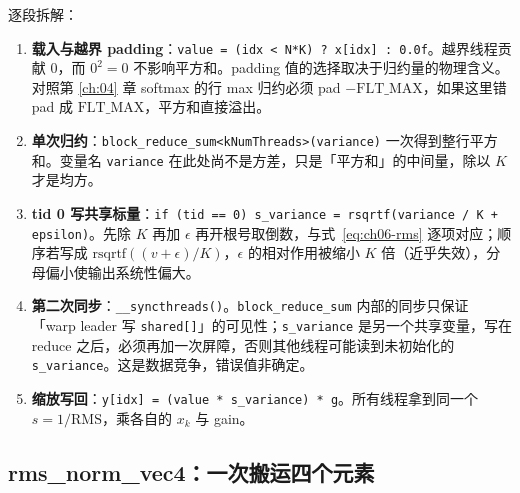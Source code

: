 逐段拆解：
\begin{enumerate}
  \item \textbf{载入与越界 padding}：\texttt{value = (idx < N*K) ? x[idx] : 0.0f}。越界线程贡献 $0$，而 $0^2 = 0$ 不影响平方和。padding 值的选择取决于归约量的物理含义。对照第 \ref{ch:04} 章 softmax 的行 max 归约必须 pad $-\mathrm{FLT\_MAX}$，如果这里错 pad 成 $\mathrm{FLT\_MAX}$，平方和直接溢出。
  \item \textbf{单次归约}：\texttt{block\_\allowbreak{}reduce\_\allowbreak{}sum\allowbreak{}<k\allowbreak{}Num\allowbreak{}Threads>\allowbreak{}(variance)} 一次得到整行平方和。变量名 \texttt{variance} 在此处尚不是方差，只是「平方和」的中间量，除以 $K$ 才是均方。
  \item \textbf{tid 0 写共享标量}：\texttt{if \allowbreak{}(tid =\allowbreak{}=\allowbreak{} 0) s\_\allowbreak{}variance =\allowbreak{} rsqrtf\allowbreak{}(variance /\allowbreak{} K + epsilon)}。先除 $K$ 再加 $\epsilon$ 再开根号取倒数，与式~\eqref{eq:ch06-rms} 逐项对应；顺序若写成 $\mathrm{rsqrtf}((v + \epsilon)/K)$，$\epsilon$ 的相对作用被缩小 $K$ 倍（近乎失效），分母偏小使输出系统性偏大。
  \item \textbf{第二次同步}：\texttt{\_\allowbreak{}\_\allowbreak{}syncthreads\allowbreak{}()}。\texttt{block\_\allowbreak{}reduce\_\allowbreak{}sum} 内部的同步只保证「warp leader 写 \texttt{shared[]}」的可见性；\texttt{s\_variance} 是另一个共享变量，写在 reduce 之后，必须再加一次屏障，否则其他线程可能读到未初始化的 \texttt{s\_variance}。这是数据竞争，错误值非确定。
  \item \textbf{缩放写回}：\texttt{y[idx] = (value * s\_variance) * g}。所有线程拿到同一个 $s = 1/\mathrm{RMS}$，乘各自的 $x_k$ 与 gain。
\end{enumerate}

\subsection{rms\_norm\_vec4：一次搬运四个元素}



